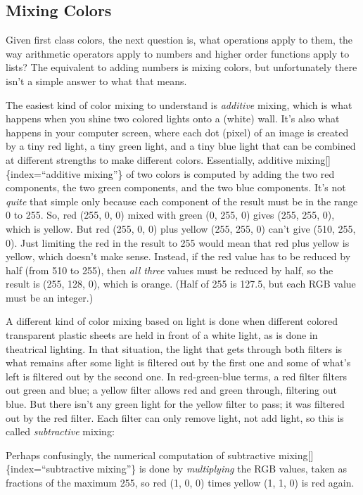 \documentclass[
  letterpaper,
]{book}
\begin{document}
\subsection{Mixing Colors}\label{mixing-colors}

Given first class colors, the next question is, what operations apply to
them, the way arithmetic operators apply to numbers and higher order
functions apply to lists? The equivalent to adding numbers is mixing
colors, but unfortunately there isn't a simple answer to what that
means.

The easiest kind of color mixing to understand is \emph{additive}
mixing, which is what happens when you shine two colored lights onto a
(white) wall. It's also what happens in your computer screen, where each
dot (pixel) of an image is created by a tiny red light, a tiny green
light, and a tiny blue light that can be combined at different strengths
to make different colors. Essentially, additive
mixing{[}{]}\{index=``additive mixing''\} of two colors is computed by
adding the two red components, the two green components, and the two
blue components. It's not \emph{quite} that simple only because each
component of the result must be in the range 0 to 255. So, red (255, 0,
0) mixed with green (0, 255, 0) gives (255, 255, 0), which is yellow.
But red (255, 0, 0) plus yellow (255, 255, 0) can't give (510, 255, 0).
Just limiting the red in the result to 255 would mean that red plus
yellow is yellow, which doesn't make sense. Instead, if the red value
has to be reduced by half (from 510 to 255), then \emph{all three}
values must be reduced by half, so the result is (255, 128, 0), which is
orange. (Half of 255 is 127.5, but each RGB value must be an integer.)

A different kind of color mixing based on light is done when different
colored transparent plastic sheets are held in front of a white light,
as is done in theatrical lighting. In that situation, the light that
gets through both filters is what remains after some light is filtered
out by the first one and some of what's left is filtered out by the
second one. In red-green-blue terms, a red filter filters out green and
blue; a yellow filter allows red and green through, filtering out blue.
But there isn't any green light for the yellow filter to pass; it was
filtered out by the red filter. Each filter can only remove light, not
add light, so this is called \emph{subtractive} mixing:

Perhaps confusingly, the numerical computation of subtractive
mixing{[}{]}\{index=``subtractive mixing''\} is done by
\emph{multiplying} the RGB values, taken as fractions of the maximum
255, so red (1, 0, 0) times yellow (1, 1, 0) is red again.
\end{document}
